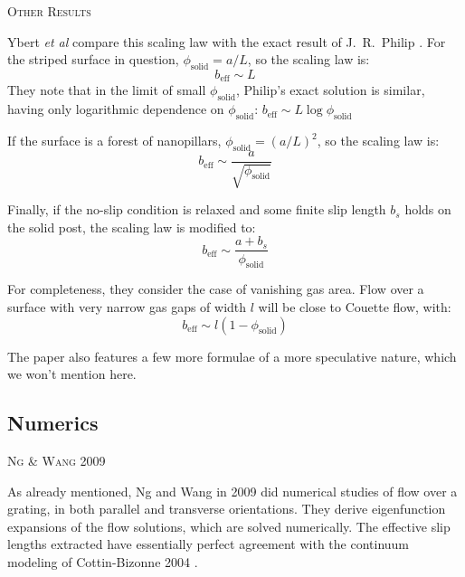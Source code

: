 \documentclass[12pt, a4paper, twoside, openright]{book}
\newcommand{\beff}{\ensuremath{b_{\mathrm{eff}}}}
\newcommand{\phisol}{\ensuremath{\phi_{\mathrm{solid}}}}
\newcommand{\paper}[1]
         {\colorbox[gray]{0.8}{ \textsc{#1}}
         
         }
\begin{document}
\vspace{1em}
\colorbox[gray]{0.8}{ \textsc{Other Results} }
\vspace{0.5em}


Ybert \emph{et al} compare this scaling law with the exact result of J.\ R.\ Philip \cite{Philip1972}.  For the striped surface in question, $\phisol = a/L$, so the scaling law is:
\begin{equation}
\beff \sim L
\end{equation}
They note that in the limit of small $\phisol$, Philip's exact solution is similar, having only logarithmic dependence on $\phisol$: $\beff \sim L \log \phisol $


\vspace{1em}

If the surface is a forest of nanopillars, $\phisol = (a/L)^2$, so the scaling law is:
\begin{equation}
\beff \sim  \frac{a}{\sqrt{ \phisol}} 
\end{equation}

\vspace{1em}
Finally, if the no-slip condition is relaxed and some finite slip length $b_s$ holds on the solid post, the scaling law is modified to:
\begin{equation}
\beff \sim  \frac{a + b_s}{\phisol} 
\end{equation}

\vspace{1em}
For completeness, they consider the case of vanishing gas area.  Flow over a surface with very narrow gas gaps of width $l$ will be close to Couette flow, with:
\begin{equation}
\beff \sim l (1-\phisol) 
\end{equation}

The paper also features a few more formulae of a more speculative nature, which we won't mention here.


\clearpage
\subsection*{Numerics}

\paper{Ng \& Wang 2009}
As already mentioned, Ng and Wang in 2009 \cite{NgWang2009} did numerical studies of flow over a grating, in both parallel and transverse orientations. They derive eigenfunction expansions of the flow solutions, which are solved numerically.  The effective slip lengths extracted have essentially perfect agreement with the continuum modeling of Cottin-Bizonne 2004 \cite{Cottin-Bizonne2004}.
\end{document}
